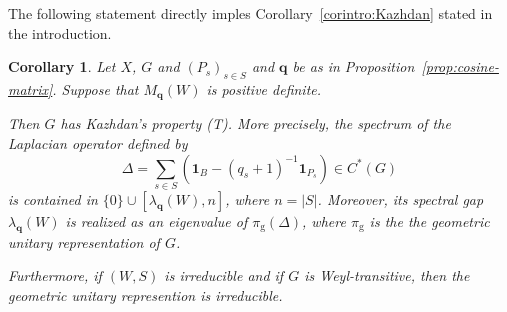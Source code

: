 \documentclass[12pt,a4paper]{amsproc}
\newtheorem{corollary}[theorem]{Corollary}
\theoremstyle{definition}
\newcommand{\one}{\mathbf 1}
\newcommand{\qq}{\mathbf q}
\newcommand{\rg}{\mathrm g}
\begin{document}
 The following statement directly imples Corollary~\ref{corintro:Kazhdan} stated in the introduction. 
 
\begin{corollary}\label{cor:Kazhdan}
Let $X$, $G$ and $(P_s)_{s \in S}$ and $\qq$ be as in Proposition~\ref{prop:cosine-matrix}. Suppose that   $M_\qq(W)$ is positive definite. 

Then $G$ has Kazhdan's property (T). More precisely, the spectrum of the Laplacian operator defined by 
$$\Delta = \sum_{s\in S} (\one_B - (q_s+1)^{-1}\one_{P_s}) \in C^*(G)$$
is contained in $\{0\} \cup [\lambda_\qq(W), n]$, where $n = |S|$.  
Moreover, its spectral gap $\lambda_\qq(W)$ is realized as an eigenvalue of $\pi_\rg(\Delta)$, where $\pi_\rg$ is the  the geometric unitary representation of $G$. 

Furthermore,  if $(W, S)$ is irreducible and if  $G$ is Weyl-transitive, then the geometric unitary represention is  irreducible.
\end{corollary}
\end{document}
